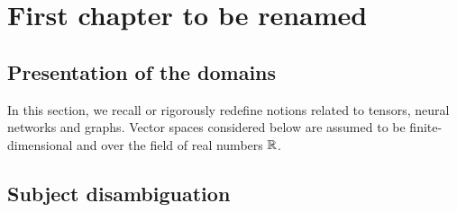 \setcounter{chapter}{-1}
\chapter{First chapter to be renamed}

\minitoc
\newpage

\section{Presentation of the domains}

In this section, we recall or rigorously redefine notions related to tensors, neural networks and graphs. Vector spaces considered below are assumed to be finite-dimensional and over the field of real numbers $\mathbb{R}$.


\newpage

\newpage

\newpage

\section{Subject disambiguation}


\newpage